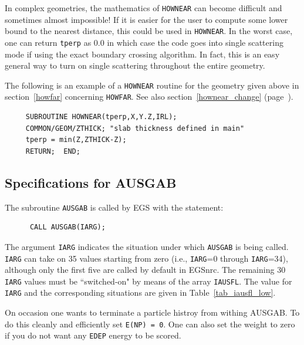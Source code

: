 In complex geometries, the mathematics of {\tt HOWNEAR} can become difficult and
sometimes almost impossible!  If it is easier for the user to compute
some lower bound to the nearest distance, this could be
used in {\tt HOWNEAR}.  In the worst case, one can return \verb+tperp+ as 0.0
in which case the code goes into single scattering mode if using the
exact boundary crossing algorithm.  In fact, this is an easy general way to
turn on single scattering throughout the entire geometry.

The following is an example of a {\tt HOWNEAR} routine for the geometry given
above in section~\ref{howfar} concerning {\tt HOWFAR}.
See also section~\ref{hownear_change} (page~\pageref{hownear_change}).
\begin{verbatim}
     SUBROUTINE HOWNEAR(tperp,X,Y.Z,IRL);
     COMMON/GEOM/ZTHICK; "slab thickness defined in main"
     tperp = min(Z,ZTHICK-Z);
     RETURN;  END;
\end{verbatim}



\subsection{Specifications for AUSGAB}
\label{ausgab}

The subroutine {\tt AUSGAB} is called by EGS with the statement:
\begin{verbatim}
      CALL AUSGAB(IARG);
\end{verbatim}
The argument {\tt IARG} indicates the situation under which {\tt AUSGAB}
is being called.  {\tt IARG} can take on 35 values starting from zero
(i.e., {\tt IARG}=0 through {\tt IARG}=34), although only the first
five are called by default in EGSnrc.  The remaining 30 {\tt IARG}
values must be ``switched-on" by means of the array {\tt IAUSFL}.
The value for {\tt IARG} and the corresponding situations are given in
Table~\ref{tab_iausfl_low}.

On occasion one wants to terminate a particle histroy from withing AUSGAB.
To do this cleanly and efficiently set {\tt E(NP) = 0}. One can also set
the weight to zero if you do not want any {\tt EDEP} energy to be scored.

